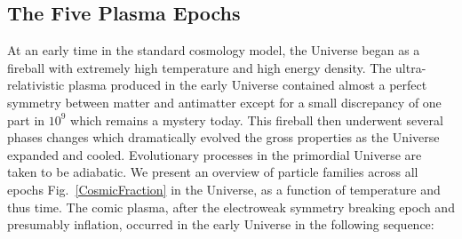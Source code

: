 \documentclass[universe,article,submit,moreauthors,pdftex,a4paper]{Definitions/mdpi}
\newcommand*{\rf}[1]{Fig.~{\ref{#1}}}
\begin{document}
\subsection{The Five Plasma Epochs}\label{sec:Timeline}
\noindent At an early time in the standard cosmology model, the Universe began as a fireball with extremely high temperature and high energy density. The ultra-relativistic plasma produced in the early Universe contained almost a perfect symmetry between matter and antimatter except for a small discrepancy of one part in $10^{9}$ which remains a mystery today. This fireball then underwent several phases changes which dramatically evolved the gross properties as the Universe expanded and cooled. Evolutionary processes in the primordial Universe are taken to be adiabatic. We present an overview of particle families across all epochs \rf{CosmicFraction} in the Universe, as a function of temperature and thus time. The comic plasma, after the electroweak symmetry breaking epoch and presumably inflation, occurred in the early Universe in the following sequence:
\end{document}
